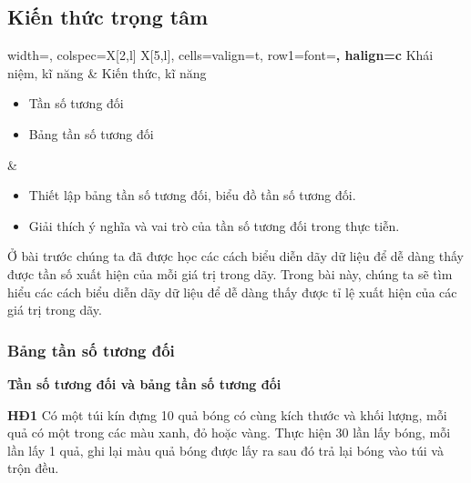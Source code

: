 \begin{lesson}
    \subsection{Kiến thức trọng tâm}

    \begin{center}
    \begin{tblr}{
        width=\linewidth,
        colspec={X[2,l] X[5,l]},
        cells={valign=t},
        row{1}={font=\bfseries, halign=c}
    }
        Khái niệm, kĩ năng & Kiến thức, kĩ năng \\
        \begin{minipage}[t]{\linewidth}
        \begin{itemize}
            \item Tần số tương đối
            \item Bảng tần số tương đối
        \end{itemize}
        \end{minipage}
        &
        \begin{minipage}[t]{\linewidth}
        \begin{itemize}
            \item Thiết lập bảng tần số tương đối, biểu đồ tần số tương đối.
            \item Giải thích ý nghĩa và vai trò của tần số tương đối trong thực tiễn.
        \end{itemize}
        \end{minipage}
    \end{tblr}
    \end{center}

    Ở bài trước chúng ta đã được học các cách biểu diễn dãy dữ liệu để dễ dàng thấy được tần số xuất hiện của mỗi giá trị trong dãy. Trong bài này, chúng ta sẽ tìm hiểu các cách biểu diễn dãy dữ liệu để dễ dàng thấy được tỉ lệ xuất hiện của các giá trị trong dãy.

    \subsubsection{Bảng tần số tương đối}

    \textbf{Tần số tương đối và bảng tần số tương đối}

    \textbf{HĐ1} Có một túi kín đựng 10 quả bóng có cùng kích thước và khối lượng, mỗi quả có một trong các màu xanh, đỏ hoặc vàng. Thực hiện 30 lần lấy bóng, mỗi lần lấy 1 quả, ghi lại màu quả bóng được lấy ra sau đó trả lại bóng vào túi và trộn đều.


\end{lesson}
